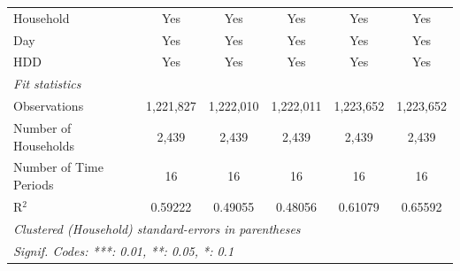 \begin{table}[htbp]
\begin{tabular}{lccccc}
      Household                                   & Yes              & Yes                & Yes             & Yes             & Yes\\  
      Day                                         & Yes              & Yes                & Yes             & Yes             & Yes\\  
      HDD                                         & Yes              & Yes                & Yes             & Yes             & Yes\\  
      \midrule
      \emph{Fit statistics}\\
      Observations                                & 1,221,827        & 1,222,010          & 1,222,011       & 1,223,652       & 1,223,652\\  
      Number of Households              & 2,439            & 2,439              & 2,439           & 2,439           & 2,439\\  
      Number of Time Periods                      & 16               & 16                 & 16              & 16              & 16\\  
      R$^2$                                       & 0.59222          & 0.49055            & 0.48056         & 0.61079         & 0.65592\\  
      \midrule \midrule
      \multicolumn{6}{l}{\emph{Clustered (Household) standard-errors in parentheses}}\\
      \multicolumn{6}{l}{\emph{Signif. Codes: ***: 0.01, **: 0.05, *: 0.1}}\\
   \end{tabular}
\end{table}


